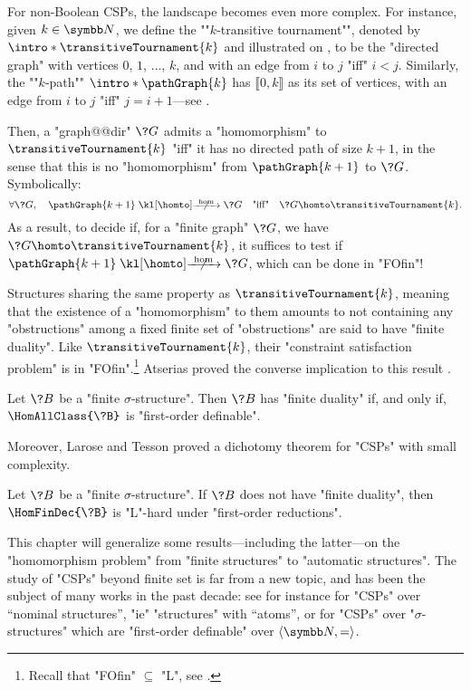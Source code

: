 For non-Boolean CSPs, the landscape becomes even more complex.
For instance, given $k\in\N$, we define the \AP""$k$-transitive tournament"", denoted
by \AP$\intro*\transitiveTournament{k}$ and illustrated on ,
to be the "directed graph" with vertices $0$, $1$, $\hdots$, $k$,
and with an edge from $i$ to $j$ "iff" $i < j$.
Similarly, the \AP""$k$-path"" \AP$\intro*\pathGraph{k}$ has $\lBrack 0,k\rBrack$ as
its set of vertices, with an edge from $i$ to $j$ "iff" $j = i + 1$---see .

Then, a "graph@@dir" $\?G$ admits a "homomorphism" to $\transitiveTournament{k}$ "iff"
it has no directed path of size $k+1$, in the sense that this is no "homomorphism"
from $\pathGraph{k+1}$ to $\?G$. Symbolically:
\[
	\forall \?G,\quad
	\pathGraph{k+1} \nothomto \?G
	\quad\text{"iff"}\quad
	\?G \homto \transitiveTournament{k}.
\]
As a result, to decide if, for a "finite graph" $\?G$, we have
$\?G \homto \transitiveTournament{k}$, it suffices
to test if $\pathGraph{k+1} \nothomto \?G$, which can be done in "FOfin"!

Structures sharing the same property as $\transitiveTournament{k}$, meaning that
the existence of a "homomorphism" to them amounts to not containing any "obstructions"
among a fixed finite set of "obstructions" are said to have "finite duality".
Like $\transitiveTournament{k}$, their "constraint satisfaction problem"
is in "FOfin".\footnote{Recall that "FOfin" $\subseteq$ "L", see .}
Atserias proved the converse implication to this result \cite[Corollary 4]{Atserias2008DigraphColoring}.

\AP\begin{proposition}
	Let $\?B$ be a "finite $\sigma$-structure". Then $\?B$ has "finite duality"
	if, and only if, $\HomAllClass{\?B}$ is "first-order definable".
\end{proposition}

Moreover, Larose and Tesson proved a dichotomy theorem for "CSPs" with small complexity.
\begin{proposition}
	Let $\?B$ be a "finite $\sigma$-structure". If $\?B$ does not have "finite duality",
	then $\HomFinDec{\?B}$ is "L"-hard under "first-order reductions".
\end{proposition}

This chapter will generalize some results---including the latter---on the "homomorphism problem"
from "finite structures" to "automatic structures". The study of "CSPs" beyond finite set
is far from a new topic, and has been the subject of many works in the past decade:
see for instance \cite{KlinKopczynskiOchremiakTorunczyk2015LocallyFiniteCSP} for "CSPs"
over ``nominal structures'', "ie" "structures" with ``atoms'',
or \cite{KlinLasotaOchremiakTorunczyk2016HomomorphismProblems} for "CSPs" over
"$\sigma$-structures" which are "first-order definable" over $\tup{\N,{=}}$.


